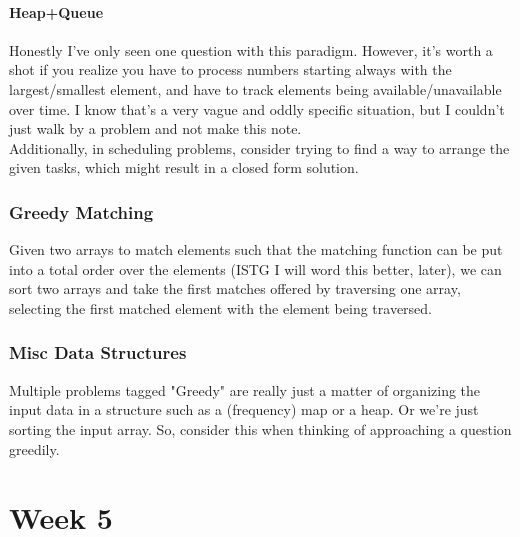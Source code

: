 \documentclass{report}
\begin{document}
\subsubsection*{Heap+Queue}
Honestly I've only seen one question with this paradigm. However,
it's worth a shot if you realize you have to process numbers
starting always with the largest/smallest element, and have to 
track elements being available/unavailable over time.
I know that's a very vague and oddly specific situation,
but I couldn't just walk by a problem and not make this note.
\\
Additionally, in scheduling problems, consider trying to find
a way to arrange the given tasks, which might result in a
closed form solution.
\subsection{Greedy Matching}
Given two arrays to match elements such that the matching function
can be put into a total order over the elements (ISTG I will word this better,
later), we can sort two arrays and take the first matches offered
by traversing one array, selecting the first matched element with
the element being traversed.
\subsection{Misc Data Structures}
Multiple problems tagged "Greedy" are really just a matter of
organizing the input data in a structure such as a (frequency)
map or a heap. Or we're just sorting the input array.
So, consider this when thinking of approaching 
a question greedily.
\chapter{Week 5}
\end{document}
